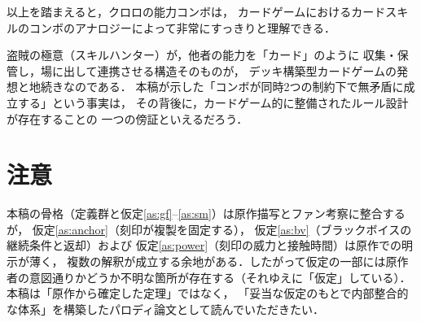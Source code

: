 \documentclass[a4paper,12pt]{jarticle}
\theoremstyle{definition}
\theoremstyle{plain}
\theoremstyle{definition}
\theoremstyle{remark}
\begin{document}
以上を踏まえると，クロロの能力コンボは，
{カードゲームにおけるカードスキルのコンボ}のアナロジーによって非常にすっきりと理解できる．

盗賊の極意（スキルハンター）が，他者の能力を「カード」のように
収集・保管し，場に出して連携させる構造そのものが，
デッキ構築型カードゲームの発想と地続きなのである．
本稿が示した「コンボが同時2つの制約下で無矛盾に成立する」という事実は，
その背後に，カードゲーム的に整備されたルール設計が存在することの
一つの傍証といえるだろう．

\section*{注意}

\noindent
本稿の骨格（定義群と仮定\ref{as:gf}--\ref{as:sm}）は原作描写とファン考察に整合するが，
仮定\ref{as:anchor}（刻印が複製を固定する），
仮定\ref{as:bv}（ブラックボイスの継続条件と返却）および
仮定\ref{as:power}（刻印の威力と接触時間）は原作での明示が薄く，
複数の解釈が成立する余地がある．したがって仮定の一部には原作者の意図通りかどうか不明な箇所が存在する（それゆえに「仮定」している）．
本稿は「原作から確定した定理」ではなく，
「妥当な仮定のもとで内部整合的な体系」を構築したパロディ論文として読んでいただきたい．

\bigskip
\end{document}

